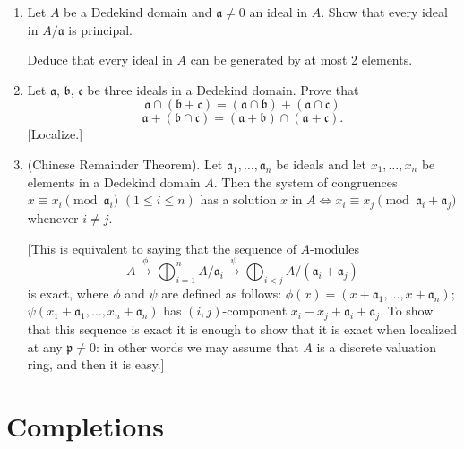\begin{enumerate}
\item Let $A$ be a Dedekind domain and $\mathfrak a\neq0$ an ideal in $A$. Show that every ideal in $A/\mathfrak a$ is principal.

Deduce that every ideal in $A$ can be generated by at most 2 elements.

\item Let $\mathfrak a$, $\mathfrak b$, $\mathfrak c$ be three ideals in a Dedekind domain. Prove that
\[
 \mathfrak a\cap(\mathfrak b+\mathfrak c)=(\mathfrak a\cap\mathfrak b)+(\mathfrak a\cap\mathfrak c)
\]
\[
 \mathfrak a+(\mathfrak b\cap\mathfrak c)=(\mathfrak a+\mathfrak b)\cap(\mathfrak a+\mathfrak c).
\]
[Localize.]

\item (Chinese Remainder Theorem). Let $\mathfrak a_1,\ldots,\mathfrak a_n$ be ideals and let $x_1,\ldots,x_n$ be elements in a Dedekind domain $A$. Then the system of congruences $x\equiv x_i\pmod{\mathfrak a_i}$ $(1\leq i\leq n)$ has a solution $x$ in $A\Longleftrightarrow x_i\equiv x_j\pmod{\mathfrak a_i+\mathfrak a_j}$ whenever $i\neq j$.

[This is equivalent to saying that the sequence of $A$-modules
\[
 A\xrightarrow{\phi}\bigoplus_{i=1}^n A/\mathfrak a_i\xrightarrow{\psi}\bigoplus_{i<j}A/(\mathfrak a_i+\mathfrak a_j)
\]
is exact, where $\phi$ and $\psi$ are defined as follows:
$\phi(x)=(x+\mathfrak a_1,\ldots,x+\mathfrak a_n)$; $\psi(x_1+\mathfrak a_1,\ldots,x_n+\mathfrak a_n)$ has $(i,j)$-component $x_i-x_j+\mathfrak a_i+\mathfrak a_j$. To show that this sequence is exact it is enough to show that it is exact when localized at any $\mathfrak p\neq0$: in other words we may assume that $A$ is a discrete valuation ring, and then it is easy.]
\end{enumerate}

\section{Completions}

